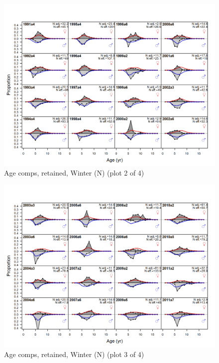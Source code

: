\documentclass[12pt,]{article}
\begin{document}
\begin{figure}
\centering
\includegraphics{r4ss/plots_mod1/comp_agefit_flt1mkt2_page2.png}
\caption{Age comps, retained, Winter (N) (plot 2 of 4)
\label{fig:age_fits}}
\end{figure}

\begin{figure}
\centering
\includegraphics{r4ss/plots_mod1/comp_agefit_flt1mkt2_page3.png}
\caption{Age comps, retained, Winter (N) (plot 3 of 4)
\label{fig:age_fits}}
\end{figure}
\end{document}
